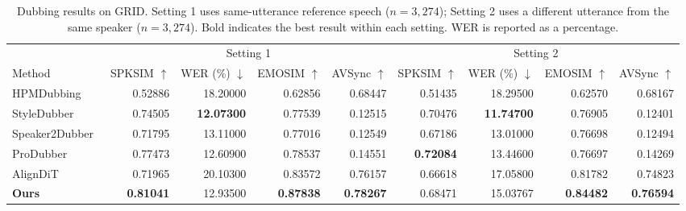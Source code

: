 \begin{table}[!t]
\centering
\caption{Dubbing results on GRID. Setting 1 uses same-utterance reference speech ($n=3,274$); Setting 2 uses a different utterance from the same speaker ($n=3,274$). Bold indicates the best result within each setting. WER is reported as a percentage.}
\label{tab:grid}
\footnotesize
\setlength{\tabcolsep}{4pt}
\begin{tabular}{@{}lrrrrrrrr@{}}
\toprule
 & \multicolumn{4}{c}{Setting 1} & \multicolumn{4}{c}{Setting 2} \\
\cmidrule(lr){2-5}\cmidrule(l){6-9}
Method & SPKSIM $\uparrow$ & WER (\%) $\downarrow$ & EMOSIM $\uparrow$ & AVSync $\uparrow$ & SPKSIM $\uparrow$ & WER (\%) $\downarrow$ & EMOSIM $\uparrow$ & AVSync $\uparrow$ \\
\midrule
HPMDubbing~\cite{cong2023hpmdubbing} & 0.52886 & 18.20000 & 0.62856 & 0.68447 & 0.51435 & 18.29500 & 0.62570 & 0.68167 \\
StyleDubber~\cite{cong2024styledubber} & 0.74505 & \textbf{12.07300} & 0.77539 & 0.12515 & 0.70476 & \textbf{11.74700} & 0.76905 & 0.12401 \\
Speaker2Dubber~\cite{zhang2024speaker2dubber} & 0.71795 & 13.11000 & 0.77016 & 0.12549 & 0.67186 & 13.01000 & 0.76698 & 0.12494 \\
ProDubber~\cite{zhang2025produbber} & 0.77473 & 12.60900 & 0.78537 & 0.14551 & \textbf{0.72084} & 13.44600 & 0.76697 & 0.14269 \\
AlignDiT~\cite{choi2025aligndit} & 0.71965 & 20.10300 & 0.83572 & 0.76157 & 0.66618 & 17.05800 & 0.81782 & 0.74823 \\
\midrule
\textbf{Ours} & \textbf{0.81041} & 12.93500 & \textbf{0.87838} & \textbf{0.78267} & 0.68471 & 15.03767 & \textbf{0.84482} & \textbf{0.76594} \\
\bottomrule
\end{tabular}
\end{table}
